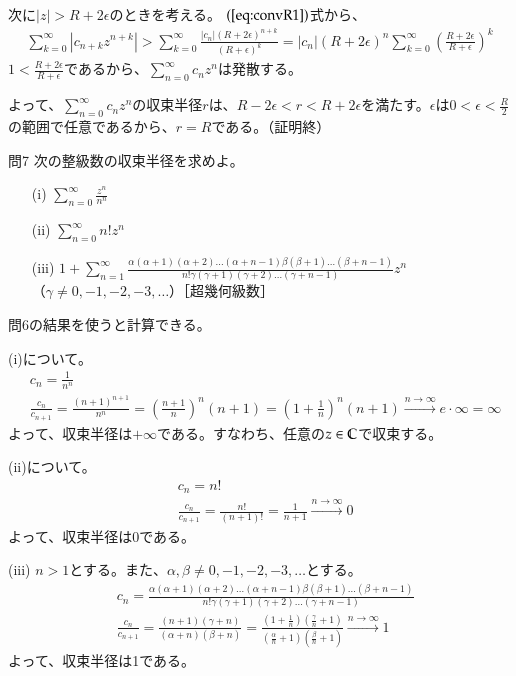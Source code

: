 次に$|z|>R+2\epsilon$のときを考える。
$(\ref{eq:convR1})$式から、
\begin{align*}
    \sum_{k=0}^\infty |c_{n+k}z^{n+k}|
    >\sum_{k=0}^\infty \frac{|c_n|(R+2\epsilon)^{n+k}}{(R+\epsilon)^k}=|c_n|(R+2\epsilon)^n\sum_{k=0}^\infty \left(\frac{R+2\epsilon}{R+\epsilon}\right)^k
\end{align*}
$1<\frac{R+2\epsilon}{R+\epsilon}$であるから、$\sum_{n=0}^\infty c_nz^n$は発散する。

よって、$\sum_{n=0}^\infty c_nz^n$の収束半径$r$は、$R-2\epsilon<r<R+2\epsilon$を満たす。$\epsilon$は$0<\epsilon<\frac{R}{2}$の範囲で任意であるから、$r=R$である。（証明終）

\begin{mysimplebox}{問7}
    次の整級数の収束半径を求めよ。
    \begin{itemize}
        \item[(i)]{$\displaystyle\sum_{n=0}^{\infty}\frac{z^n}{n^n}$}
        \item[(ii)]{$\displaystyle\sum_{n=0}^{\infty}n!z^n$}
        \item[(iii)]{$\displaystyle 1+\sum_{n=1}^{\infty}\frac{\alpha(\alpha+1)(\alpha+2)\dots(\alpha+n-1)\beta(\beta+1)\dots(\beta+n-1)}{n!\gamma(\gamma+1)(\gamma+2)\dots(\gamma+n-1)}z^n$\\（$\gamma\neq 0, -1,-2,-3,\dots$）［超幾何級数］} 
    \end{itemize}
\end{mysimplebox}
問6の結果を使うと計算できる。

(i)について。
\begin{align*}
    &c_n=\frac{1}{n^n}\\
    &\frac{c_n}{c_{n+1}}=\frac{(n+1)^{n+1}}{n^n}=\left(\frac{n+1}{n}\right)^n(n+1)=\left(1+\frac{1}{n}\right)^n(n+1)\overset{n\longrightarrow\infty}{\longrightarrow}e\cdot \infty=\infty
\end{align*}
よって、収束半径は$+\infty$である。すなわち、任意の$z\in\mathbb{C}$で収束する。

(ii)について。
\begin{align*}
    &c_n=n!\\
    &\frac{c_n}{c_{n+1}}=\frac{n!}{(n+1)!}=\frac{1}{n+1}\overset{n\longrightarrow\infty}{\longrightarrow}0
\end{align*}
よって、収束半径は0である。

(iii)
$n>1$とする。また、$\alpha, \beta\neq 0, -1,-2,-3,\dots$とする。
\begin{align*}
    &c_n=\frac{\alpha(\alpha+1)(\alpha+2)\dots(\alpha+n-1)\beta(\beta+1)\dots(\beta+n-1)}{n!\gamma(\gamma+1)(\gamma+2)\dots(\gamma+n-1)}\\
    &\frac{c_n}{c_{n+1}}=\frac{(n+1)(\gamma+n)}{(\alpha+n)(\beta+n)}=\frac{(1+\frac{1}{n})(\frac{\gamma}{n}+1)}{(\frac{\alpha}{n}+1)(\frac{\beta}{n}+1)}\overset{n\longrightarrow\infty}{\longrightarrow}1
\end{align*}
よって、収束半径は1である。

